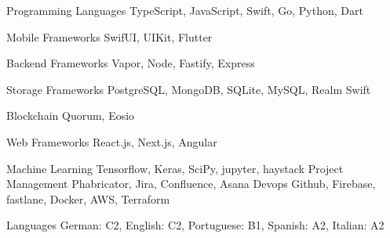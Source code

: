

\begin{cvskills}

\cvskill
{Programming Languages} %
{TypeScript, JavaScript, Swift, Go, Python, Dart} %
\vspace{0.4cm}

\cvskill
{Mobile Frameworks} %
{SwifUI, UIKit, Flutter} %
\vspace{0.4cm}

\cvskill
{Backend Frameworks} %
{Vapor, Node, Fastify, Express} %
\vspace{0.4cm}

\cvskill
{Storage Frameworks} %
{PostgreSQL, MongoDB, SQLite, MySQL, Realm Swift} %
\vspace{0.4cm}

\cvskill
{Blockchain} %
{Quorum, Eosio} %
\vspace{0.4cm}

\cvskill
{Web Frameworks} %
{React.js, Next.js, Angular} %
\vspace{0.4cm}

\cvskill
{Machine Learning} %
{Tensorflow, Keras, SciPy, jupyter, haystack} %
\vspace{0.4cm}
\cvskill
{Project Management} %
{Phabricator, Jira, Confluence, Asana} %
\vspace{0.4cm}
\cvskill
{Devops} %
{Github, Firebase, fastlane, Docker, AWS, Terraform} %
\vspace{0.4cm}


\cvskill
{Languages} %
{German: C2, English: C2, Portuguese: B1, Spanish: A2, Italian: A2} %


\end{cvskills}
